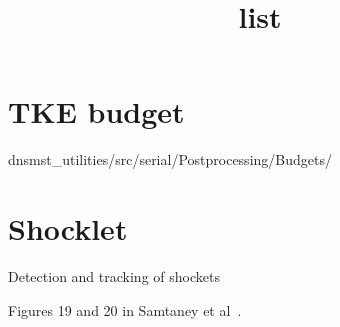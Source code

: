 \documentclass[12pt, oneside]{article}
\title{list}
\author{}
\begin{document}
\maketitle

\section{TKE budget} 
dnsmst\_utilities/src/serial/Postprocessing/Budgets/

\section{Shocklet} 

Detection and tracking of shockets

Figures 19 and 20 in Samtaney et al~\cite{samtaney2001direct}.  




\newpage



\end{document}

